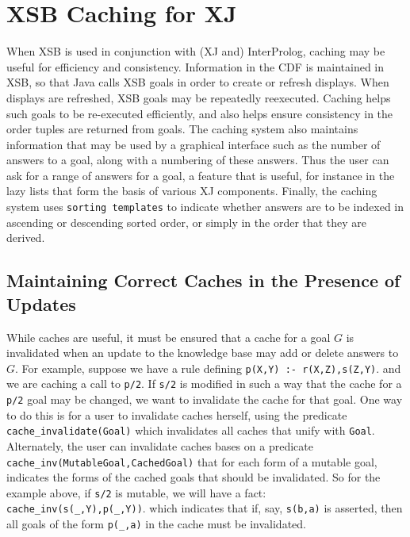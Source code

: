 \section{XSB Caching for XJ}
	   
When XSB is used in conjunction with (XJ and) InterProlog, caching may
be useful for efficiency and consistency.  Information in the CDF is
maintained in XSB, so that Java calls XSB goals in order to create or
refresh displays.  When displays are refreshed, XSB goals may be
repeatedly reexecuted.  Caching helps such goals to be re-executed
efficiently, and also helps ensure consistency in the order tuples are
returned from goals.  The caching system also maintains information
that may be used by a graphical interface such as the number of
answers to a goal, along with a numbering of these answers.  Thus the
user can ask for a range of answers for a goal, a feature that is
useful, for instance in the lazy lists that form the basis of various
XJ components.  Finally, the caching system uses {\tt sorting templates}
to indicate whether answers are to be indexed in ascending or
descending sorted order, or simply in the order that they are derived.

\subsection{Maintaining Correct Caches in the Presence of Updates}
\label{sec:cache-maint}

While caches are useful, it must be ensured that a cache for a goal
$G$ is invalidated when an update to the knowledge base may add or
delete answers to $G$.  For example, suppose we have a rule defining
{\tt p(X,Y) :- r(X,Z),s(Z,Y)}. and we are caching a call to {\tt p/2}.
If {\tt s/2} is modified in such a way that the cache for a {\tt p/2}
goal may be changed, we want to invalidate the cache for that goal.
One way to do this is for a user to invalidate caches herself, using
the predicate {\tt cache\_invalidate(Goal)} which invalidates all
caches that unify with {\tt Goal}.  Alternately, the user can
invalidate caches bases on a predicate {\tt
cache\_inv(MutableGoal,CachedGoal)} that for each form of a mutable
goal, indicates the forms of the cached goals that should be
invalidated.  So for the example above, if {\tt s/2} is mutable, we
will have a fact: {\tt cache\_inv(s(\_,Y),p(\_,Y))}. which indicates
that if, say, {\tt s(b,a)} is asserted, then all goals of the form
{\tt p(\_,a)} in the cache must be invalidated.

